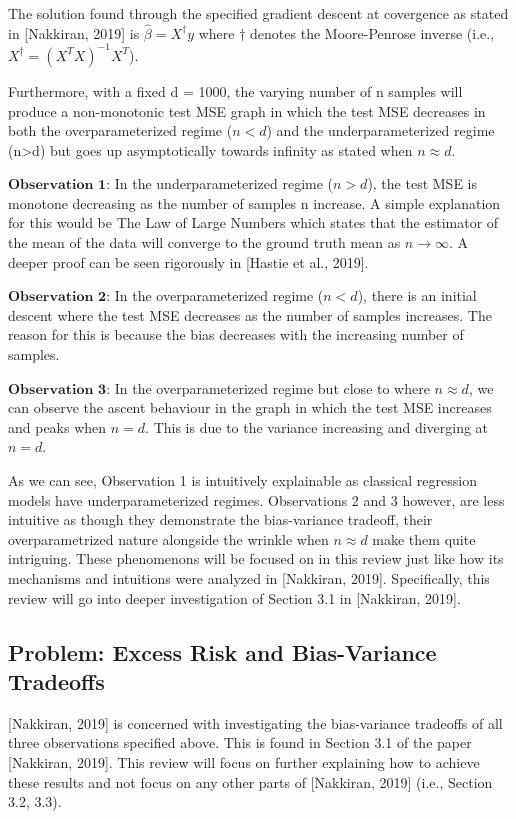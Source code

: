 \documentclass{article}
\begin{document}
The solution found through the specified gradient descent at covergence as stated in [Nakkiran, 2019] is $\hat{\beta} = X^{\dagger}y$ where $\dagger$ denotes the Moore-Penrose inverse (i.e., $X^{\dagger} = (X^{T}X)^{-1}X^{T}$).

Furthermore, with a fixed d = 1000, the varying number of n samples will produce a non-monotonic test MSE graph in which the test MSE decreases in both the overparameterized regime ($n < d$) and the underparameterized regime (n>d) but goes up asymptotically towards infinity as stated when $n \approx d$.

$\textbf{Observation 1}$: In the underparameterized regime ($n > d$), the test MSE is monotone decreasing as the number of samples n increase. A simple explanation for this would be The Law of Large Numbers which states that the estimator of the mean of the data will converge to the ground truth mean as $n \rightarrow \infty$. A deeper proof can be seen rigorously in [Hastie et al., 2019].

$\textbf{Observation 2}$: In the overparameterized regime ($n < d$), there is an initial descent where the test MSE decreases as the number of samples increases. The reason for this is because the bias decreases with the increasing number of samples.

$\textbf{Observation 3}$: In the overparameterized regime but close to where $n \approx d$, we can observe the ascent behaviour in the graph in which the test MSE increases and peaks when $n=d$. This is due to the variance increasing and diverging at $n=d$.

As we can see, Observation 1 is intuitively explainable as classical regression models have underparameterized regimes. Observations 2 and 3 however, are less intuitive as though they demonstrate the bias-variance tradeoff, their overparametrized nature alongside the wrinkle when $n \approx d$ make them quite intriguing. These phenomenons will be focused on in this review just like how its mechanisms and intuitions were analyzed in [Nakkiran, 2019]. Specifically, this review will go into deeper investigation of Section 3.1 in [Nakkiran, 2019].



\subsection{Problem: Excess Risk and Bias-Variance Tradeoffs}

[Nakkiran, 2019] is concerned with investigating the bias-variance tradeoffs of all three observations specified above. This is found in Section 3.1 of the paper [Nakkiran, 2019]. This review will focus on further explaining how to achieve these results and not focus on any other parts of [Nakkiran, 2019] (i.e., Section 3.2, 3.3).
\end{document}
